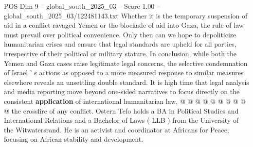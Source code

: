 \begin{textsample}{POS Dim 9 – global\_south\_2025\_03 – Score 1.00 – global\_south\_2025\_03/122481143.txt}
Whether it is the temporary suspension of aid in a conflict-ravaged Yemen or the blockade of aid into Gaza, the rule of law must prevail over political convenience.
Only then can we hope to depoliticize humanitarian crises and ensure that legal standards are upheld for all parties, irrespective of their political or military stature.
In conclusion, while both the Yemen and Gaza cases raise legitimate legal concerns, the selective condemnation of Israel ' s actions as opposed to a more measured response to similar measures elsewhere reveals an unsettling double standard.
It is high time that legal analysis and media reporting move beyond one-sided narratives to focus directly on the consistent \textbf{application} of international humanitarian law, @ @ @ @ @ @ @ @ @ @ the crossfire of any conflict.
Ostern Tefo holds a BA in Political Studies and International Relations and a Bachelor of Laws ( LLB ) from the University of the Witwatersrand.
He is an activist and coordinator at Africans for Peace, focusing on African stability and development.

\end{textsample}
